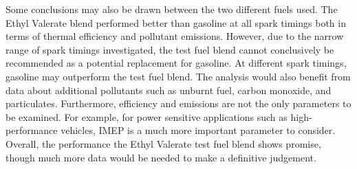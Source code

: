 \documentclass[11pt]{article}
\begin{document}
Some conclusions may also be drawn between the two different fuels used. The Ethyl Valerate blend performed better than gasoline at all spark timings both in terms of thermal efficiency and pollutant emissions. However, due to the narrow range of spark timings investigated, the test fuel blend cannot conclusively be recommended as a potential replacement for gasoline. At different spark timings, gasoline may outperform the test fuel blend. The analysis would also benefit from data about additional pollutants such as unburnt fuel, carbon monoxide, and particulates. Furthermore, efficiency and emissions are not the only parameters to be examined. For example, for power sensitive applications such as high-performance vehicles, IMEP is a much more important parameter to consider. Overall, the performance the Ethyl Valerate test fuel blend shows promise, though much more data would be needed to make a definitive judgement. 
\begin{thebibliography}{00}

\end{thebibliography}
\end{document}
